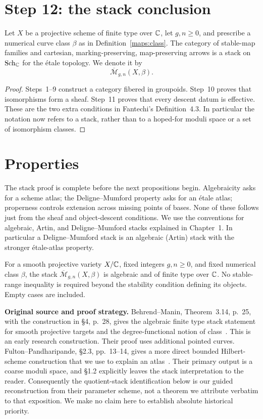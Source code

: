 \section{Step 12: the stack conclusion}

\begin{Th}\label{maps:stack}
Let $X$ be a projective scheme of finite type over $\mathbb C$, let $g,n\geq0$, and prescribe a numerical curve class $\beta$ as in Definition~\ref{maps:class}. The category of stable-map families and cartesian, marking-preserving, map-preserving arrows is a stack on $\operatorname{Sch}_{\mathbb C}$ for the \'etale topology. We denote it by
\[
 \overline{\mathcal M}_{g,n}(X,\beta).
\]
\end{Th}
\begin{proof}
Steps~1--9 construct a category fibered in groupoids. Step~10 proves that isomorphisms form a sheaf. Step~11 proves that every descent datum is effective. These are the two extra conditions in Fantechi's Definition~4.3. In particular the notation now refers to a stack, rather than to a hoped-for moduli space or a set of isomorphism classes.
\end{proof}

\section{Properties}
\label{maps:properties}

The stack proof is complete before the next propositions begin. Algebraicity asks for a scheme atlas; the Deligne--Mumford property asks for an \'etale atlas; properness controls extension across missing points of bases. None of these follows just from the sheaf and object-descent conditions. We use the conventions for algebraic, Artin, and Deligne--Mumford stacks explained in Chapter~1. In particular a Deligne--Mumford stack is an algebraic (Artin) stack with the stronger \'etale-atlas property.

\begin{Prop}\label{maps:algebraic}
For a smooth projective variety $X/\mathbb C$, fixed integers $g,n\geq0$, and fixed numerical class $\beta$, the stack $\overline{\mathcal M}_{g,n}(X,\beta)$ is algebraic and of finite type over $\mathbb C$. No stable-range inequality is required beyond the stability condition defining its objects. Empty cases are included.
\end{Prop}

\noindent\textbf{Original source and proof strategy.}
Behrend--Manin, Theorem~3.14, p.~25, with the construction in \S4, p.~28, gives the algebraic finite type stack statement for smooth projective targets and the degree-functional notion of class~\cite{BM}. This is an early research construction. Their proof uses additional pointed curves. Fulton--Pandharipande, \S2.3, pp.~13--14, gives a more direct bounded Hilbert-scheme construction that we use to explain an atlas~\cite{FP}. Their primary output is a coarse moduli space, and \S1.2 explicitly leaves the stack interpretation to the reader. Consequently the quotient-stack identification below is our guided reconstruction from their parameter scheme, not a theorem we attribute verbatim to that exposition. We make no claim here to establish absolute historical priority.

